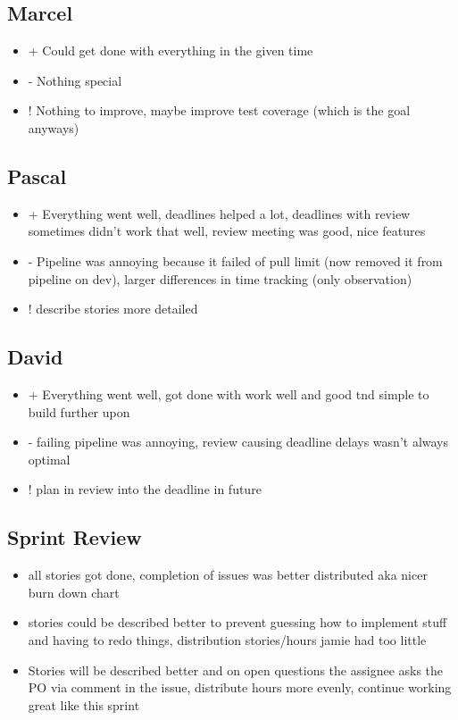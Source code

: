 \subsection{Marcel}
\begin{itemize}
    \item + Could get done with everything in the given time
    \item - Nothing special
    \item ! Nothing to improve, maybe improve test coverage (which is the goal anyways)
\end{itemize}

\subsection{Pascal}
\begin{itemize}
    \item + Everything went well, deadlines helped a lot, deadlines with review sometimes didn't work that well, review meeting was good, nice features
    \item - Pipeline was annoying because it failed of pull limit (now removed it from pipeline on dev), larger differences in time tracking (only observation)
    \item ! describe stories more detailed
\end{itemize}

\subsection{David}
\begin{itemize}
    \item + Everything went well, got done with work well and good tnd simple to build further upon
    \item - failing pipeline was annoying, review causing deadline delays wasn't always optimal
    \item ! plan in review into the deadline in future
\end{itemize}

\subsection{Sprint Review}
\begin{itemize}
    \item all stories got done, completion of issues was better distributed aka nicer burn down chart
    \item stories could be described better to prevent guessing how to implement stuff and having to redo things, distribution stories/hours jamie had too little
    \item Stories will be described better and on open questions the assignee asks the PO via comment in the issue, distribute hours more evenly, continue working great like this sprint
\end{itemize}

